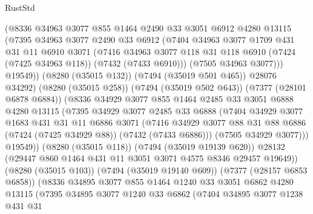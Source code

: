\begin{lexlean}{RustStd}
\begin{coremodule}
              (@8336
                @34963
                @3077
                @855
                @1464
                @2490
                @33
                @3051
                @6912
                @4280
                @13115
                (@7395
                  @34963
                  @3077
                  @2490
                  @33
                  @6912
                  (@7404
                    @34963
                    @3077
                    @1709
                    @431
                    @31
                    @11
                    @6910
                    @3071
                    (@7416
                      @34963
                      @3077
                      @118
                      @31
                      @118
                      @6910
                      (@7424 (@7425 @34963 @118))
                      (@7432 (@7433 @6910)))
                    (@7505 @34963 @3077)))
                @19549))
            (@8280 (@35015 @132))
            (@7494 (@35019 @501 @465))
            @28076
            @34292)
          (@8280 (@35015 @258))
          (@7494 (@35019 @502 @643))
          (@7377 (@28101 @6878 @6884))
          (@8336
            @34929
            @3077
            @855
            @1464
            @2485
            @33
            @3051
            @6888
            @4280
            @13115
            (@7395
              @34929
              @3077
              @2485
              @33
              @6888
              (@7404
                @34929
                @3077
                @1683
                @431
                @31
                @11
                @6886
                @3071
                (@7416
                  @34929
                  @3077
                  @88
                  @31
                  @88
                  @6886
                  (@7424 (@7425 @34929 @88))
                  (@7432 (@7433 @6886)))
                (@7505 @34929 @3077)))
            @19549))
        (@8280 (@35015 @118))
        (@7494 (@35019 @19139 @620))
        @28132
        (@29447 @860 @1464 @431 @11 @3051 @3071 @4575 @8346 @29457 @19649))
      (@8280 (@35015 @103))
      (@7494 (@35019 @19140 @609))
      (@7377 (@28157 @6853 @6858))
      (@8336
        @34895
        @3077
        @855
        @1464
        @1240
        @33
        @3051
        @6862
        @4280
        @13115
        (@7395
          @34895
          @3077
          @1240
          @33
          @6862
          (@7404
            @34895
            @3077
            @1238
            @431
            @31

\end{coremodule}
\end{lexlean}
